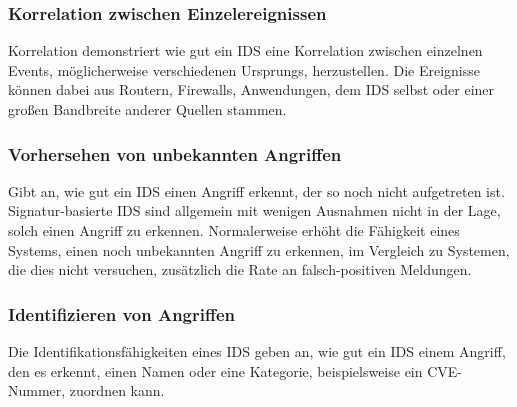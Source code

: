 \subsubsection{Korrelation zwischen Einzelereignissen }
Korrelation demonstriert wie gut ein IDS eine Korrelation zwischen einzelnen Events, möglicherweise verschiedenen Ursprungs, herzustellen. Die Ereignisse können dabei aus Routern, Firewalls, Anwendungen, dem IDS selbst oder einer großen Bandbreite anderer Quellen stammen.
\subsubsection{Vorhersehen von unbekannten Angriffen}
Gibt an, wie gut ein IDS einen Angriff erkennt, der so noch nicht aufgetreten ist. Signatur-basierte IDS sind allgemein mit wenigen Ausnahmen nicht in der Lage, solch einen Angriff zu erkennen. Normalerweise erhöht die Fähigkeit eines Systems, einen noch unbekannten Angriff zu erkennen, im Vergleich zu Systemen, die dies nicht versuchen, zusätzlich die Rate an falsch-positiven Meldungen.
\subsubsection{Identifizieren von Angriffen}
Die Identifikationsfähigkeiten eines IDS  geben an, wie gut ein IDS einem Angriff, den es erkennt, einen Namen oder eine Kategorie, beispielsweise ein CVE-Nummer, zuordnen kann.

